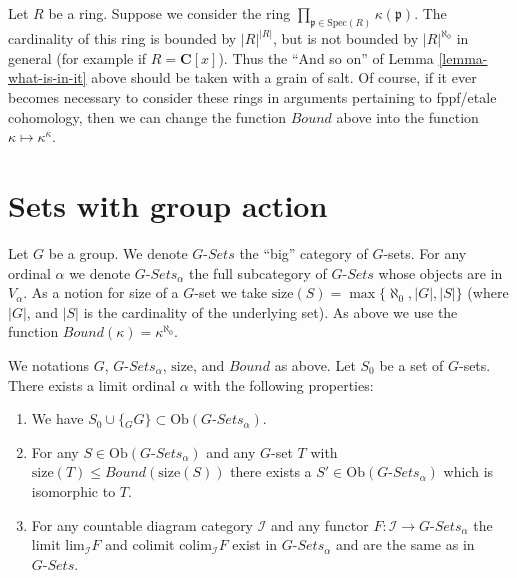 \begin{remark}
\label{remark-what-is-not-in-it}
Let $R$ be a ring. Suppose we consider the ring
$\prod_{\mathfrak p \in \text{Spec}(R)} \kappa(\mathfrak p)$.
The cardinality of this ring is bounded by $|R|^{|R|}$, but is not bounded by
$|R|^{\aleph_0}$ in general (for example if $R = \mathbf{C}[x]$).
Thus the ``And so on'' of Lemma \ref{lemma-what-is-in-it} above
should be taken with a grain of salt. Of course, if it ever becomes
necessary to consider these rings in arguments pertaining to
fppf/etale cohomology, then we can change the function
$Bound$ above into the function $\kappa \mapsto \kappa^\kappa$.
\end{remark}



\section{Sets with group action}
\label{section-sets-with-group-action}

\noindent
Let $G$ be a group. We denote $G\textit{-Sets}$ the ``big'' category
of $G$-sets. For any ordinal $\alpha$ we denote
$G\textit{-Sets}_\alpha$ the full subcategory of $G\textit{-Sets}$
whose objects are in $V_\alpha$. As a notion for size of a $G$-set
we take $\text{size}(S) = \max\{\aleph_0, |G|, |S|\}$ (where $|G|$, and
$|S|$ is the cardinality of the underlying set). As above we use the function
$Bound(\kappa) = \kappa^{\aleph_0}$.

\begin{lemma}
\label{lemma-sets-with-group-action}
We notations $G$, $G\textit{-Sets}_\alpha$, $\text{size}$,
and $Bound$ as above. Let $S_0$ be a set of $G$-sets.
There exists a limit ordinal $\alpha$ with the following properties:
\begin{enumerate}
\item We have $S_0 \cup \{{}_GG\} \subset \text{Ob}(G\textit{-Sets}_\alpha)$.
\item For any $S \in \text{Ob}(G\textit{-Sets}_\alpha)$ and any
$G$-set $T$ with $\text{size}(T) \leq Bound(\text{size}(S))$
there exists a $S' \in \text{Ob}(G\textit{-Sets}_\alpha)$
which is isomorphic to $T$.
\item For any countable diagram category $\mathcal{I}$ and
any functor $F : \mathcal{I} \to G\textit{-Sets}_\alpha$ the
limit $\text{lim}_{\mathcal{I}} F$ and colimit
$\text{colim}_\mathcal{I} F$ exist in $G\textit{-Sets}_\alpha$
and are the same as in $G\textit{-Sets}$.
\end{enumerate}
\end{lemma}

